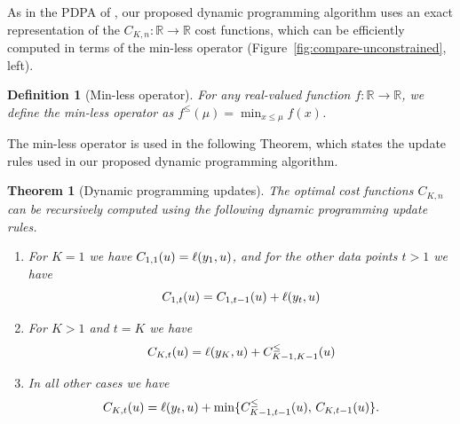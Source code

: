 \documentclass{article}
\newtheorem{theorem}{Theorem}
\newtheorem{definition}{Definition}
\newcommand{\RR}{\mathbb R}
\begin{document}
As in the PDPA of \citet{pruned-dp}, our proposed dynamic programming
algorithm uses an exact representation of the
$C_{K,n}:\RR\rightarrow\RR$ cost functions, which can be efficiently
computed in terms of the min-less operator (Figure~\ref{fig:compare-unconstrained}, left). 

\begin{definition}[Min-less operator]
For any real-valued
function $f:\RR\rightarrow\RR$, we define the min-less operator as
$f^\leq(\mu)=\min_{x\leq \mu} f(x)$.
\end{definition}

The min-less operator is used in the following Theorem, which states
the update rules used in our proposed dynamic programming algorithm.

\begin{theorem}[Dynamic programming updates]
  The optimal cost functions $C_{K,n}$ can be recursively computed using the
  following dynamic programming update rules.
\begin{enumerate}
\item For $K=1$ we have
$C_{1,1}(u)=\ell(y_1,u)$, and for the other data
  points $t>1$ we have
\begin{equation}
C_{1,t}(u)=C_{1,t-1}(u)+\ell(y_t,u)
\end{equation}
\item For $K>1$ and $t=K$ we have
\begin{equation}
  C_{K,t}(u)=\ell(y_K, u)+C_{K-1,K-1}^\leq(u)
\end{equation}
\item In all other cases we have
  \begin{equation}
  C_{K,t}(u)=\ell(y_t,u)+
  \min\{
  C_{K-1,t-1}^\leq(u),\,
  C_{K,t-1}(u)
  \}.
  \end{equation}
\end{enumerate}
\end{theorem}
\end{document}
